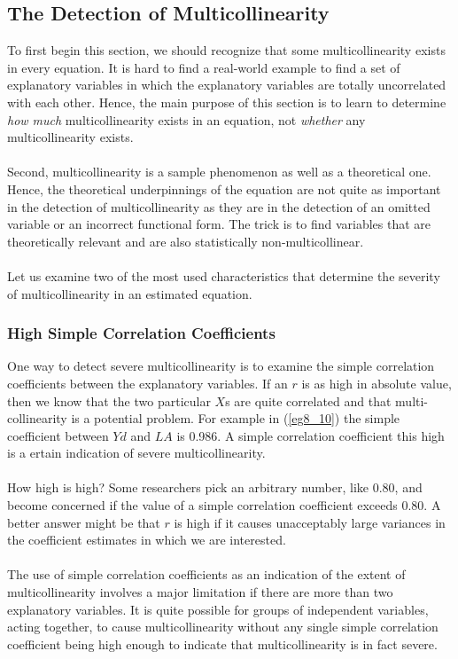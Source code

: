 \documentclass[11pt]{article}
\begin{document}
\subsection{The Detection of Multicollinearity}
To first begin this section, we should recognize that some multicollinearity exists in every equation. It is hard to find a real-world example to find a set of explanatory variables in which the explanatory variables are totally uncorrelated with each other. Hence, the main purpose of this section is to learn to determine \textit{how much} multicollinearity exists in an equation, not \textit{whether} any multicollinearity exists.\\ \\
Second, multicollinearity is a sample phenomenon as well as a theoretical one. Hence, the theoretical underpinnings of the equation are not quite as important in the detection of multicollinearity as they are in the detection of an omitted variable or an incorrect functional form.  The trick is to find variables that are theoretically relevant and are also statistically non-multicollinear.\\ \\
Let us examine two of the most used characteristics that determine the severity of multicollinearity in an estimated equation.
\subsubsection{High Simple Correlation Coefficients}
One way to detect severe multicollinearity is to examine the simple correlation coefficients between the explanatory variables. If an $r$ is as high in absolute value, then we know that the two particular $X$s are quite correlated and that multi-collinearity is a potential problem. For example in (\ref{eg8_10}) the simple coefficient between $Yd$ and $LA$ is 0.986. A simple correlation coefficient this high is a ertain indication of severe multicollinearity.\\ \\
How high is high? Some researchers pick an arbitrary number, like 0.80, and become concerned if the value of a simple correlation coefficient exceeds 0.80. A better answer might be that $r$ is high if it causes unacceptably large variances in the coefficient estimates in which we are interested.\\ \\
The use of simple correlation coefficients as an indication of the extent of multicollinearity involves a major limitation if there are more than two explanatory variables. It is quite possible for groups of independent variables, acting together, to cause multicollinearity without any single simple correlation coefficient being high enough to indicate that multicollinearity is in fact severe.
\end{document}
